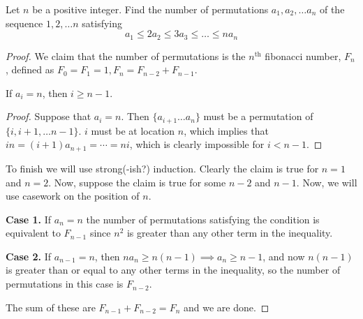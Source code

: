 \documentclass[a4paper]{scrartcl}
\begin{document}
\begin{lstlistings}
\begin{example*} %
	[2020 IMO Shortlist C1]
	Let $n$ be a positive integer. 
	Find the number of permutations 
	$a_1, a_2, \dots a_n$ of the sequence $1,2,\dots n$ 
	satisfying 
	\[a_1 \leqslant 2a_2 \leqslant 3a_3 \leqslant \dots \leqslant na_n\]
\end{example*}

\begin{proof} %
	We claim that the number of permutations is the $n^\text{th}$ fibonacci number, $F_n$, defined as $F_0 = F_1 = 1, F_n = F_{n-2} + F_{n-1}$.
	\begin{claim*} %
		If $a_i = n$, then $i \geq n-1$.
	\end{claim*}
	\begin{proof}
	Suppose that $a_i = n$. 
	Then $\{a_{i+1} \dots a_n\}$ must be a permutation of $\{ i, i+1, \dots n-1\}$.
	$i$ must be at location $n$,
	which implies that $in = (i+1)a_{n+1} = \cdots = ni$, 
	which is clearly impossible for $i < n-1$.
	\end{proof}

	To finish we will use strong(-ish?) induction.
	Clearly the claim is true for $n=1$ and $n=2$.
	Now, suppose the claim is true for some $n-2$ and $n-1$.
	Now, we will use casework on the position of $n$.

	\textbf{Case 1.} If $a_n = n$ the number of permutations 
	satisfying the condition is equivalent to $F_{n-1}$ 
	since $n^2$ is greater than any other term in the inequality.

	\textbf{Case 2.} If $a_{n-1} = n$, then 
	$na_n \geq n(n-1) \implies a_{n} \geq n-1$, 
	and now $n(n-1)$ is greater than or equal to 
	any other terms in the inequality, 
	so the number of permutations in this case is $F_{n-2}$.

	The sum of these are $F_{n-1} + F_{n-2} = F_n$ and we are done.
\end{proof}
\end{lstlistings}
\end{document}
